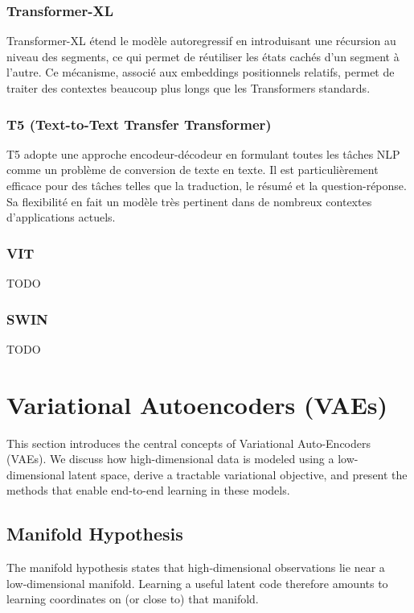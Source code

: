\documentclass{article}
\begin{document}
\subsubsection{Transformer-XL}
Transformer-XL étend le modèle autoregressif en introduisant une récursion au niveau des segments, ce qui permet de réutiliser les états cachés d’un segment à l’autre. Ce mécanisme, associé aux embeddings positionnels relatifs, permet de traiter des contextes beaucoup plus longs que les Transformers standards.

\subsubsection{T5 (Text-to-Text Transfer Transformer)}
T5 adopte une approche encodeur-décodeur en formulant toutes les tâches NLP comme un problème de conversion de texte en texte. Il est particulièrement efficace pour des tâches telles que la traduction, le résumé et la question-réponse. Sa flexibilité en fait un modèle très pertinent dans de nombreux contextes d'applications actuels.

\subsubsection{VIT}
TODO

\subsubsection{SWIN}
TODO

\clearpage\newpage

\section{Variational Autoencoders (VAEs)}
This section introduces the central concepts of Variational Auto-Encoders (VAEs). We discuss how high-dimensional data is modeled using a low-dimensional latent space, derive a tractable variational objective, and present the methods that enable end-to-end learning in these models.

\subsection{Manifold Hypothesis}
The manifold hypothesis states that high‑dimensional observations lie near a low‑dimensional manifold. Learning a useful latent code therefore amounts to learning coordinates on (or close to) that manifold.
\end{document}

